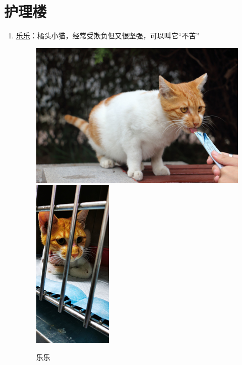 \documentclass[zihao=-4,fontset=none]{Beautybook-CN}
\begin{document}
\section{护理楼}
\begin{enumerate}
    \item \hyperref[img5758]{乐乐}：橘头小猫，经常受欺负但又很坚强，可以叫它``不苦''
    \begin{figure}[htbp]
            \centering
            \includegraphics[width=0.4\linewidth]{media/cimage57.png}
        \qquad
            \includegraphics[width=0.4\linewidth]{media/cimage58.png}
            \caption{乐乐}
            \label{img5758}
    \end{figure}
    \end{enumerate}
\end{document}
